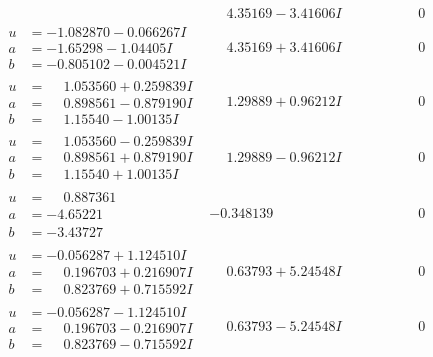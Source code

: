 \documentclass[1p]{elsarticle_modified}
\theoremstyle{definition}
\begin{document}
$$\begin{array}{c|c|c}
 & \phantom{-}4.35169 - 3.41606 I & \phantom{-0.000000 } 0 \\ \hline\begin{aligned}
u &= -1.082870 - 0.066267 I \\
a &= -1.65298 - 1.04405 I \\
b &= -0.805102 - 0.004521 I\end{aligned}
 & \phantom{-}4.35169 + 3.41606 I & \phantom{-0.000000 } 0 \\ \hline\begin{aligned}
u &= \phantom{-}1.053560 + 0.259839 I \\
a &= \phantom{-}0.898561 - 0.879190 I \\
b &= \phantom{-}1.15540 - 1.00135 I\end{aligned}
 & \phantom{-}1.29889 + 0.96212 I & \phantom{-0.000000 } 0 \\ \hline\begin{aligned}
u &= \phantom{-}1.053560 - 0.259839 I \\
a &= \phantom{-}0.898561 + 0.879190 I \\
b &= \phantom{-}1.15540 + 1.00135 I\end{aligned}
 & \phantom{-}1.29889 - 0.96212 I & \phantom{-0.000000 } 0 \\ \hline\begin{aligned}
u &= \phantom{-}0.887361\phantom{ +0.000000I} \\
a &= -4.65221\phantom{ +0.000000I} \\
b &= -3.43727\phantom{ +0.000000I}\end{aligned}
 & -0.348139\phantom{ +0.000000I} & \phantom{-0.000000 } 0 \\ \hline\begin{aligned}
u &= -0.056287 + 1.124510 I \\
a &= \phantom{-}0.196703 + 0.216907 I \\
b &= \phantom{-}0.823769 + 0.715592 I\end{aligned}
 & \phantom{-}0.63793 + 5.24548 I & \phantom{-0.000000 } 0 \\ \hline\begin{aligned}
u &= -0.056287 - 1.124510 I \\
a &= \phantom{-}0.196703 - 0.216907 I \\
b &= \phantom{-}0.823769 - 0.715592 I\end{aligned}
 & \phantom{-}0.63793 - 5.24548 I & \phantom{-0.000000 } 0 \\ \hline\begin{aligned}

\end{aligned}
\end{array}$$
\end{document}

